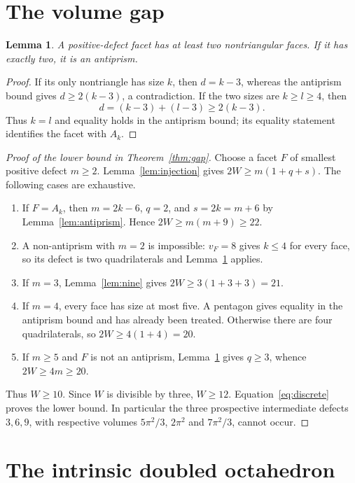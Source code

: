 \documentclass[11pt]{article}
\newtheorem{lemma}[theorem]{Lemma}
\theoremstyle{remark}
\begin{document}
\section{The volume gap}\label{sec:gap}
\begin{lemma}\label{lem:two}
A positive-defect facet has at least two nontriangular faces. If it
has exactly two, it is an antiprism.
\end{lemma}
\begin{proof}
If its only nontriangle has size $k$, then $d=k-3$, whereas the
antiprism bound gives $d\ge2(k-3)$, a contradiction. If the two sizes
are $k\ge l\ge4$, then
\[
 d=(k-3)+(l-3)\ge2(k-3).
\]
Thus $k=l$ and equality holds in the antiprism bound; its equality
statement identifies the facet with $A_k$.
\end{proof}

\begin{proof}[Proof of the lower bound in Theorem~\ref{thm:gap}]
Choose a facet $F$ of smallest positive defect $m\ge2$.
Lemma~\ref{lem:injection} gives $2W\ge m(1+q+s)$.
The following cases are exhaustive.
\begin{enumerate}
\item If $F=A_k$, then $m=2k-6$, $q=2$, and
$s=2k=m+6$ by Lemma~\ref{lem:antiprism}. Hence
$2W\ge m(m+9)\ge22$.
\item A non-antiprism with $m=2$ is impossible: $v_F=8$ gives
$k\le4$ for every face, so its defect is two quadrilaterals and
Lemma~\ref{lem:two} applies.
\item If $m=3$, Lemma~\ref{lem:nine} gives $2W\ge3(1+3+3)=21$.
\item If $m=4$, every face has size at most five. A pentagon gives
equality in the antiprism bound and has already been treated. Otherwise
there are four quadrilaterals, so $2W\ge4(1+4)=20$.
\item If $m\ge5$ and $F$ is not an antiprism,
Lemma~\ref{lem:two} gives $q\ge3$, whence $2W\ge4m\ge20$.
\end{enumerate}
Thus $W\ge10$. Since $W$ is divisible by three, $W\ge12$.
Equation~\eqref{eq:discrete} proves the lower bound. In particular the
three prospective intermediate defects $3,6,9$, with respective
volumes $5\pi^2/3$, $2\pi^2$ and $7\pi^2/3$, cannot occur.
\end{proof}

\section{The intrinsic doubled octahedron}\label{sec:doubled}
\end{document}
